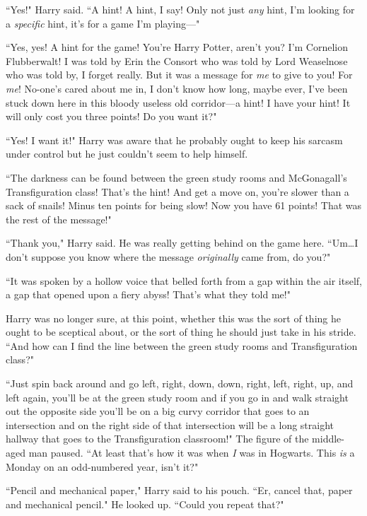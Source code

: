 ``Yes!" Harry said. ``A hint! A hint, I say! Only not just \emph{any} hint, I'm looking for a \emph{specific} hint, it's for a game I'm playing—"

``Yes, yes! A hint for the game! You're Harry Potter, aren't you? I'm Cornelion Flubberwalt! I was told by Erin the Consort who was told by Lord Weaselnose who was told by, I forget really. But it was a message for \emph{me} to give to you! For \emph{me}! No-one's cared about me in, I don't know how long, maybe ever, I've been stuck down here in this bloody useless old corridor—a hint! I have your hint! It will only cost you three points! Do you want it?"

``Yes! I want it!" Harry was aware that he probably ought to keep his sarcasm under control but he just couldn't seem to help himself.

``The darkness can be found between the green study rooms and McGonagall's Transfiguration class! That's the hint! And get a move on, you're slower than a sack of snails! Minus ten points for being slow! Now you have 61 points! That was the rest of the message!"

``Thank you," Harry said. He was really getting behind on the game here. ``Um…I don't suppose you know where the message \emph{originally} came from, do you?"

``It was spoken by a hollow voice that belled forth from a gap within the air itself, a gap that opened upon a fiery abyss! That's what they told me!"

Harry was no longer sure, at this point, whether this was the sort of thing he ought to be sceptical about, or the sort of thing he should just take in his stride. ``And how can I find the line between the green study rooms and Transfiguration class?"

``Just spin back around and go left, right, down, down, right, left, right, up, and left again, you'll be at the green study room and if you go in and walk straight out the opposite side you'll be on a big curvy corridor that goes to an intersection and on the right side of that intersection will be a long straight hallway that goes to the Transfiguration classroom!" The figure of the middle-aged man paused. ``At least that's how it was when \emph{I} was in Hogwarts. This \emph{is} a Monday on an odd-numbered year, isn't it?"

``Pencil and mechanical paper," Harry said to his pouch. ``Er, cancel that, paper and mechanical pencil." He looked up. ``Could you repeat that?"

